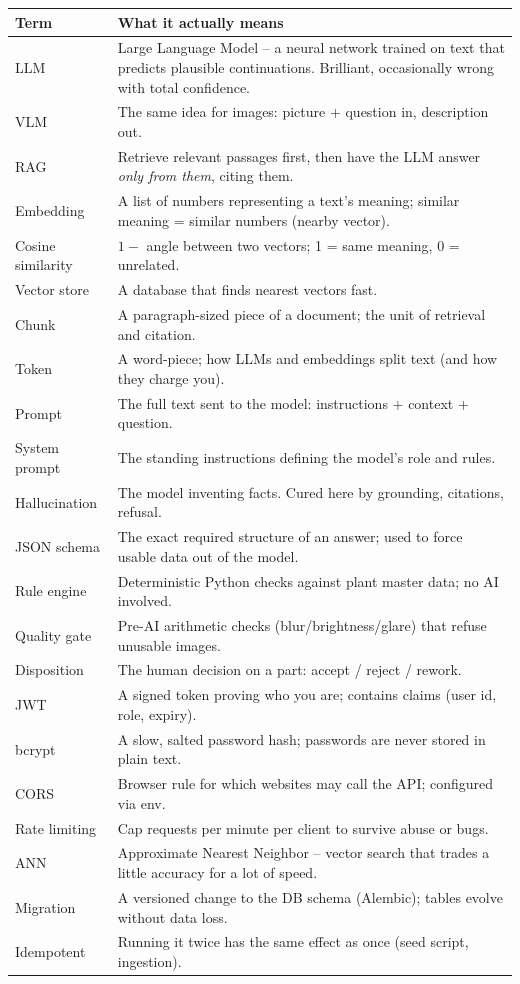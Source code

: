 \begin{longtable}{@{}p{3.4cm}p{12.2cm}@{}}
\toprule
\textbf{Term} & \textbf{What it actually means} \\
\midrule
LLM & Large Language Model -- a neural network trained on text that predicts plausible continuations. Brilliant, occasionally wrong with total confidence. \\
VLM & The same idea for images: picture + question in, description out. \\
RAG & Retrieve relevant passages first, then have the LLM answer \emph{only from them}, citing them. \\
Embedding & A list of numbers representing a text's meaning; similar meaning = similar numbers (nearby vector). \\
Cosine similarity & $1 - $ angle between two vectors; 1 = same meaning, 0 = unrelated. \\
Vector store & A database that finds nearest vectors fast. \\
Chunk & A paragraph-sized piece of a document; the unit of retrieval and citation. \\
Token & A word-piece; how LLMs and embeddings split text (and how they charge you). \\
Prompt & The full text sent to the model: instructions + context + question. \\
System prompt & The standing instructions defining the model's role and rules. \\
Hallucination & The model inventing facts. Cured here by grounding, citations, refusal. \\
JSON schema & The exact required structure of an answer; used to force usable data out of the model. \\
Rule engine & Deterministic Python checks against plant master data; no AI involved. \\
Quality gate & Pre-AI arithmetic checks (blur/brightness/glare) that refuse unusable images. \\
Disposition & The human decision on a part: accept / reject / rework. \\
JWT & A signed token proving who you are; contains claims (user id, role, expiry). \\
bcrypt & A slow, salted password hash; passwords are never stored in plain text. \\
CORS & Browser rule for which websites may call the API; configured via env. \\
Rate limiting & Cap requests per minute per client to survive abuse or bugs. \\
ANN & Approximate Nearest Neighbor -- vector search that trades a little accuracy for a lot of speed. \\
Migration & A versioned change to the DB schema (Alembic); tables evolve without data loss. \\
Idempotent & Running it twice has the same effect as once (seed script, ingestion). \\
\bottomrule
\end{longtable}

